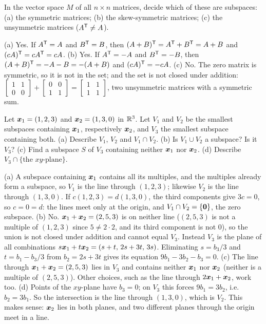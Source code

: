 \begin{exercise}\label{ex:u06-matrix-subspaces}
In the vector space $M$ of all $n\times n$ matrices, decide which of these are subspaces:
(a) the symmetric matrices; (b) the skew-symmetric matrices; (c) the unsymmetric matrices
($A^{\mathsf{T}}\neq A$).
\end{exercise}
\begin{solution}
(a) Yes. If $A^{\mathsf{T}}=A$ and $B^{\mathsf{T}}=B$, then $(A+B)^{\mathsf{T}}=A^{\mathsf{T}}+B^{\mathsf{T}}=A+B$ and $(cA)^{\mathsf{T}}=cA^{\mathsf{T}}=cA$.
(b) Yes. If $A^{\mathsf{T}}=-A$ and $B^{\mathsf{T}}=-B$, then $(A+B)^{\mathsf{T}}=-A-B=-(A+B)$ and $(cA)^{\mathsf{T}}=-cA$.
(c) No. The zero matrix is symmetric, so it is not in the set; and the set is not closed
under addition:
$\begin{bmatrix} 1&1\\ 0&0\end{bmatrix}+\begin{bmatrix} 0&0\\ 1&1\end{bmatrix}
=\begin{bmatrix} 1&1\\ 1&1\end{bmatrix}$, two unsymmetric matrices with a symmetric sum.
\end{solution}

\begin{exercise}\label{ex:u06-lines}
Let $\boldsymbol{x}_1=(1,2,3)$ and $\boldsymbol{x}_2=(1,3,0)$ in $\mathbb{R}^3$. Let $V_1$ and $V_2$ be the smallest
subspaces containing $\boldsymbol{x}_1$, respectively $\boldsymbol{x}_2$, and $V_3$ the smallest subspace
containing both. (a) Describe $V_1$, $V_2$ and $V_1\cap V_2$. (b) Is $V_1\cup V_2$ a subspace? Is it
$V_3$? (c) Find a subspace $S$ of $V_3$ containing neither $\boldsymbol{x}_1$ nor $\boldsymbol{x}_2$.
(d) Describe $V_3\cap\{\text{the $xy$-plane}\}$.
\end{exercise}
\begin{solution}
(a) A subspace containing $\boldsymbol{x}_1$ contains all its multiples, and the multiples already form
a subspace, so $V_1$ is the line through $(1,2,3)$; likewise $V_2$ is the line through
$(1,3,0)$. If $c(1,2,3)=d(1,3,0)$, the third components give $3c=0$, so $c=0=d$: the lines meet
only at the origin, and $V_1\cap V_2=\{\boldsymbol{0}\}$, the zero subspace.
(b) No. $\boldsymbol{x}_1+\boldsymbol{x}_2=(2,5,3)$ is on neither line ($(2,5,3)$ is not a multiple of $(1,2,3)$
since $5\neq2\cdot2$, and its third component is not $0$), so the union is not closed under
addition and cannot equal $V_3$. Instead $V_3$ is the plane of all combinations
$s\boldsymbol{x}_1+t\boldsymbol{x}_2=(s+t,\,2s+3t,\,3s)$. Eliminating $s=b_3/3$ and $t=b_1-b_3/3$ from
$b_2=2s+3t$ gives its equation $9b_1-3b_2-b_3=0$.
(c) The line through $\boldsymbol{x}_1+\boldsymbol{x}_2=(2,5,3)$ lies in $V_3$ and contains neither
$\boldsymbol{x}_1$ nor $\boldsymbol{x}_2$ (neither is a multiple of $(2,5,3)$). Other choices, such as the line
through $2\boldsymbol{x}_1+\boldsymbol{x}_2$, work too.
(d) Points of the $xy$-plane have $b_3=0$; on $V_3$ this forces $9b_1=3b_2$, i.e.\ $b_2=3b_1$.
So the intersection is the line through $(1,3,0)$, which is $V_2$. This makes sense: $\boldsymbol{x}_2$
lies in both planes, and two different planes through the origin meet in a line.
\end{solution}

